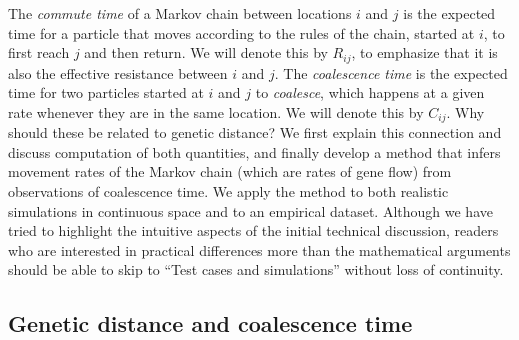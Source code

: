 \documentclass{article}
\begin{document}
The \emph{commute time} of a Markov chain between locations $i$ and $j$
is the expected time for a particle that moves according to the rules of the chain, 
started at $i$, to first reach $j$ and then return.
We will denote this by $R_{ij}$, to emphasize that it is also the effective resistance
between $i$ and $j$.
The \emph{coalescence time} is the expected time for two particles started at $i$ and $j$
to \emph{coalesce},
which happens at a given rate whenever they are in the same location.
We will denote this by $C_{ij}$.
Why should these be related to genetic distance? 
We first explain this connection and discuss computation of both quantities,
and finally develop a method that infers movement rates of the Markov chain
(which are rates of gene flow)
from observations of coalescence time. 
We apply the method to both realistic simulations in continuous space
and to an empirical dataset.
Although we have tried to highlight the intuitive aspects of the initial technical discussion,
readers who are interested in practical differences
more than the mathematical arguments should be able to skip to ``Test cases and simulations''
without loss of continuity. 


\subsection*{Genetic distance and coalescence time}
\end{document}
